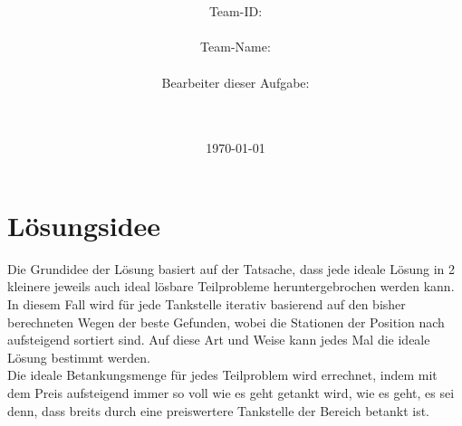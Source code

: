 \documentclass[a4paper,10pt,ngerman]{scrartcl}
\title{\textbf{\Huge\Aufgabe}}
\author{\LARGE Team-ID: \LARGE \TeamID \\\\
	    \LARGE Team-Name: \LARGE \TeamName \\\\
	    \LARGE Bearbeiter dieser Aufgabe: \\ 
	    \LARGE \Namen\\\\}
\date{\LARGE\today}
\begin{document}
\maketitle
\tableofcontents

\vspace{0.5cm}

\section{Lösungsidee}
Die Grundidee der Lösung basiert auf der Tatsache, dass jede ideale Lösung in 2 kleinere jeweils auch ideal lösbare Teilprobleme heruntergebrochen werden kann. In diesem Fall wird für jede Tankstelle iterativ basierend auf den bisher berechneten Wegen der beste Gefunden, wobei die Stationen der Position nach aufsteigend sortiert sind. Auf diese Art und Weise kann jedes Mal die ideale Lösung bestimmt werden. \\
Die ideale Betankungsmenge für jedes Teilproblem wird errechnet, indem mit dem Preis aufsteigend immer so voll wie es geht getankt wird, wie es geht, es sei denn, dass breits durch eine preiswertere Tankstelle der Bereich betankt ist. 
\end{document}
